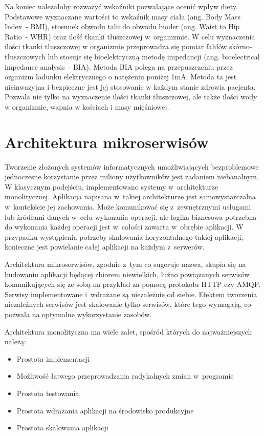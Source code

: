\par
Na koniec należałoby rozważyć wskaźniki pozwalające ocenić wpływ diety.
Podstawowe wyznaczane wartości to wskaźnik masy ciała (ang. Body Mass Index~- BMI), stosunek obwodu talii do obwodu bioder (ang. Waist to Hip Ratio~- WHR) oraz ilość tkanki tłuszczowej w~organizmie.
W celu wyznaczenia ilości tkanki tłuszczowej w organizmie przeprowadza się pomiar fałdów skórno-tłuszczowych lub stosuje się bioelektryczną metodę impedancji (ang. bioelectrical impedance analysis~- BIA).
Metoda BIA polega na przepuszczeniu przez organizm ładunku elektrycznego o natężeniu poniżej 1mA.
Metoda ta jest nieinwazyjna i bezpieczne jest jej stosowanie w każdym stanie zdrowia pacjenta.
Pozwala nie tylko na wyznaczenie ilości tkanki tłuszczowej, ale także ilości wody w organizmie, wapnia w kościach i masy mięśniowej\cite{book:dietetyka-zywienie-zdrowego-i-chorego-czlowieka}.

\section{Architektura mikroserwisów}\label{sec:usefull-technologies}

Tworzenie złożonych systemów informatycznych umożliwiających bezproblemowe jednoczesne korzystanie przez miliony użytkowników jest zadaniem niebanalnym.
W klasycznym podejściu, implementowano systemy w~architekturze monolitycznej.
Aplikacja napisana w~takiej architekturze jest samowystarczalna w~kontekście jej zachowania.
Może komunikować się z~zewnętrznymi usługami lub źródłami danych w~celu wykonania operacji,
ale logika biznesowa potrzebna do wykonania każdej operacji jest w~całości zawarta w~obrębie aplikacji.
W przypadku wystąpienia potrzeby skalowania horyzontalnego takiej aplikacji,
konieczne jest powielanie całej aplikacji na każdym z~serwerów\cite{url:microsoft-web-architectures}.

\par
Architektura mikroserwisów, zgodnie z~tym co sugeruje nazwa, skupia się na budowaniu aplikacji będącej zbiorem niewielkich,
luźno powiązanych serwisów komunikujących się ze sobą na przykład za pomocą protokołu HTTP czy AMQP.
Serwisy implementowane i~wdrażane są niezależnie od siebie\cite{book:dot-net-microservices}.
Efektem tworzenia niezależnych serwisów jest skalowanie tylko serwisów, które tego wymagają,
co pozwala na optymalne wykorzystanie zasobów\cite{book:mastering-microservices-with-java9}.

\par
Architektura monolityczna ma wiele zalet\cite{book:microservices-patterns}, spośród których do najważniejszych należą:
\begin{itemize}
    \item Prostota implementacji
    \item Możliwość łatwego przeprowadzania radykalnych zmian w~programie
    \item Prostota testowania
    \item Prostota wdrażania aplikacji na środowisko produkcyjne
    \item Prostota skalowania aplikacji
\end{itemize}

